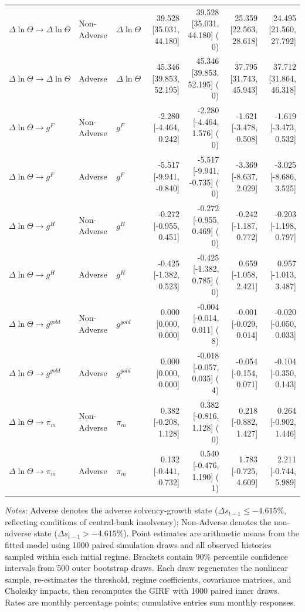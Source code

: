 \begin{table}[htbp]
{\begin{tabular}{lllrrrr}
$\Delta\ln\Theta \to \Delta\ln\Theta$ & Non-Adverse & $\Delta\ln\Theta$ & 39.528 [35.031, 44.180] & 39.528 [35.031, 44.180] ( 0) & 25.359 [22.563, 28.618] & 24.495 [21.560, 27.792] \\
$\Delta\ln\Theta \to \Delta\ln\Theta$ & Adverse & $\Delta\ln\Theta$ & 45.346 [39.853, 52.195] & 45.346 [39.853, 52.195] ( 0) & 37.795 [31.743, 45.943] & 37.712 [31.864, 46.318] \\
$\Delta\ln\Theta \to g^F$ & Non-Adverse & $g^F$ & -2.280 [-4.464, 0.242] & -2.280 [-4.464, 1.576] ( 0) & -1.621 [-3.478, 0.508] & -1.619 [-3.473, 0.532] \\
$\Delta\ln\Theta \to g^F$ & Adverse & $g^F$ & -5.517 [-9.941, -0.840] & -5.517 [-9.941, -0.735] ( 0) & -3.369 [-8.637, 2.029] & -3.025 [-8.686, 3.525] \\
$\Delta\ln\Theta \to g^H$ & Non-Adverse & $g^H$ & -0.272 [-0.955, 0.451] & -0.272 [-0.955, 0.469] ( 0) & -0.242 [-1.187, 0.772] & -0.203 [-1.198, 0.797] \\
$\Delta\ln\Theta \to g^H$ & Adverse & $g^H$ & -0.425 [-1.382, 0.523] & -0.425 [-1.382, 0.785] ( 0) & 0.659 [-1.058, 2.421] & 0.957 [-1.013, 3.487] \\
$\Delta\ln\Theta \to g^{gold}$ & Non-Adverse & $g^{gold}$ & 0.000 [0.000, 0.000] & -0.004 [-0.014, 0.011] ( 8) & -0.001 [-0.029, 0.014] & -0.020 [-0.050, 0.033] \\
$\Delta\ln\Theta \to g^{gold}$ & Adverse & $g^{gold}$ & 0.000 [0.000, 0.000] & -0.018 [-0.057, 0.035] ( 4) & -0.054 [-0.154, 0.071] & -0.104 [-0.350, 0.143] \\
$\Delta\ln\Theta \to \pi_m$ & Non-Adverse & $\pi_m$ & 0.382 [-0.208, 1.128] & 0.382 [-0.816, 1.128] ( 0) & 0.218 [-0.882, 1.427] & 0.264 [-0.902, 1.446] \\
$\Delta\ln\Theta \to \pi_m$ & Adverse & $\pi_m$ & 0.132 [-0.441, 0.732] & 0.540 [-0.476, 1.190] ( 1) & 1.783 [-0.725, 4.609] & 2.211 [-0.744, 5.989] \\
\bottomrule
\end{tabular}}
\begin{minipage}{0.98\textwidth}\footnotesize \textit{Notes:} Adverse denotes the adverse solvency-growth state ($\Delta s_{t-1} \le -4.615\%$, reflecting conditions of central-bank insolvency); Non-Adverse denotes the non-adverse state ($\Delta s_{t-1} > -4.615\%$). Point estimates are arithmetic means from the fitted model using 1000 paired simulation draws and all observed histories sampled within each initial regime. Brackets contain 90\% percentile confidence intervals from 500 outer bootstrap draws. Each draw regenerates the nonlinear sample, re-estimates the threshold, regime coefficients, covariance matrices, and Cholesky impacts, then recomputes the GIRF with 1000 paired inner draws. Rates are monthly percentage points; cumulative entries sum monthly responses.\end{minipage}
\end{table}
